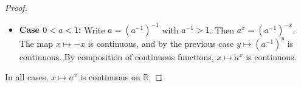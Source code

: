 \begin{proof}
\begin{itemize}
        \item \textbf{Case $0 < a < 1$:} Write $a = (a^{-1})^{-1}$ with $a^{-1} > 1$. Then $a^x = (a^{-1})^{-x}$.
        The map $x \mapsto -x$ is continuous, and by the previous case $y \mapsto (a^{-1})^y$ is continuous.
        By composition of continuous functions, $x \mapsto a^x$ is continuous.
    \end{itemize}

    In all cases, $x \mapsto a^x$ is continuous on $\mathbb{R}$.
\end{proof}